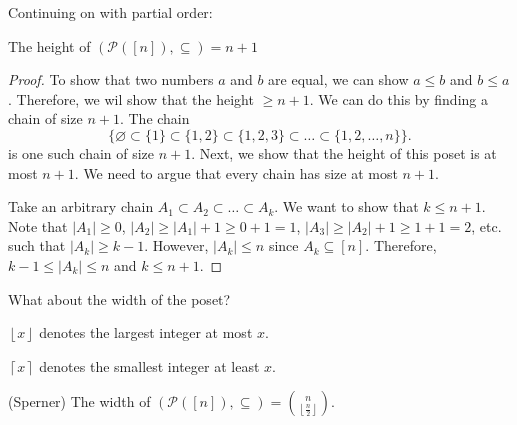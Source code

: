 
Continuing on with partial order:

\begin{prop}
	The height of \( (\mathcal{P}([n]), \subseteq) = n+1\)
\end{prop}

\begin{proof}
	To show that two numbers \( a \) and \( b \) are equal, we can show \( a\le b \) and \( b\le a \). Therefore, we wil show that the height \( \ge n+1 \). We can do this by finding a chain of size \( n+1 \). The chain \[
		\{\varnothing \subset \{1\} \subset \{1,2\} \subset \{1,2,3\} \subset \ldots \subset \{1,2,\ldots ,n\}\}
	.\] is one such chain of size \( n+1 \). Next, we show that the height of this poset is at most \( n+1 \). We need to argue that every chain has size at most \( n+1 \). \par
	Take an arbitrary chain \( A_{1}\subset A_{2}\subset \ldots \subset A_k \). We want to show that \( k\le n+1 \). Note that \( |A_{1}|\ge 0 \), \( |A_{2}|\ge |A_{1}|+1\ge 0+1=1 \), \( |A_{3}|\ge |A_{2}|+1\ge 1+1=2 \), etc. such that \( |A_k| \ge k-1 \). However, \( |A_k| \le n \) since \( A_k \subseteq [n] \). Therefore, \( k-1 \le |A_k| \le n \) and \( k\le n+1 \).
\end{proof}

What about the width of the poset?

\begin{notation}
	\( \left\lfloor x \right\rfloor \) denotes the largest integer at most \( x \).
\end{notation}

\begin{notation}
	\( \left\lceil x \right\rceil  \) denotes the smallest integer at least \( x \).
\end{notation}

\begin{theorem}
	(Sperner) The width of \( (\mathcal{P}([n]), \subseteq) = \binom{n}{\left\lfloor \frac{n}{2} \right\rfloor} \).
\end{theorem}

